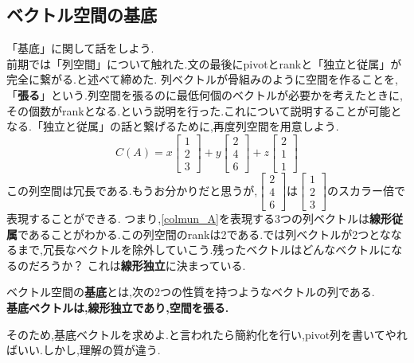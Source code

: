 \subsection{ベクトル空間の基底}\label{sub:space_base}
「基底」に関して話をしよう.\\
前期では「列空間」について触れた.文の最後にpivotとrankと「独立と従属」が完全に繋がる.と述べて締めた.
列ベクトルが骨組みのように空間を作ることを,「\textbf{張る}」という.列空間を張るのに最低何個のベクトルが必要かを考えたときに,その個数がrankとなる.という説明を行った.これについて説明することが可能となる.「独立と従属」の話と繋げるために,再度列空間を用意しよう.
\begin{equation}\label{colmun_A}
    C(A)=
    x\begin{bmatrix}1 \\ 2 \\ 3\end{bmatrix}+
    y\begin{bmatrix}2 \\ 4 \\ 6\end{bmatrix}+
    z\begin{bmatrix}2 \\ 1 \\ 1\end{bmatrix}
\end{equation}
この列空間は冗長である.もうお分かりだと思うが,$\begin{bmatrix}2 \\ 4 \\ 6\end{bmatrix}$は$\begin{bmatrix}1 \\ 2 \\ 3\end{bmatrix}$のスカラー倍で表現することができる.
つまり,\eqref{colmun_A}を表現する3つの列ベクトルは\textbf{線形従属}であることがわかる.この列空間のrankは2である.では列ベクトルが2つとななるまで,冗長なベクトルを除外していこう.残ったベクトルはどんなベクトルになるのだろうか？
これは\textbf{線形独立}に決まっている.
\begin{tcolorbox}[colframe=black!80,colback=white,title=基底の定義]
\hspace{1em}ベクトル空間の\textbf{基底}とは,次の2つの性質を持つようなベクトルの列である.\\
\textbf{基底ベクトルは,線形独立であり,空間を張る.}
\end{tcolorbox}
そのため,基底ベクトルを求めよ.と言われたら簡約化を行い,pivot列を書いてやればいい.しかし,理解の質が違う.\\
